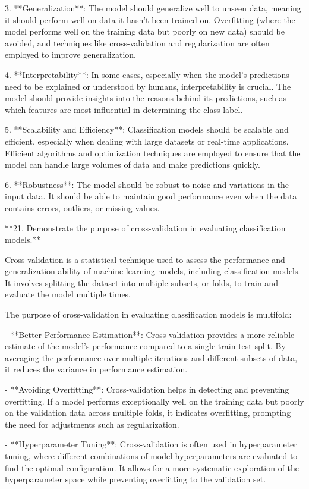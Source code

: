 3. **Generalization**: The model should generalize well to unseen data, meaning it should perform well on data it hasn't been trained on. Overfitting (where the model performs well on the training data but poorly on new data) should be avoided, and techniques like cross-validation and regularization are often employed to improve generalization.

4. **Interpretability**: In some cases, especially when the model's predictions need to be explained or understood by humans, interpretability is crucial. The model should provide insights into the reasons behind its predictions, such as which features are most influential in determining the class label.

5. **Scalability and Efficiency**: Classification models should be scalable and efficient, especially when dealing with large datasets or real-time applications. Efficient algorithms and optimization techniques are employed to ensure that the model can handle large volumes of data and make predictions quickly.

6. **Robustness**: The model should be robust to noise and variations in the input data. It should be able to maintain good performance even when the data contains errors, outliers, or missing values.

**21. Demonstrate the purpose of cross-validation in evaluating classification models.**

Cross-validation is a statistical technique used to assess the performance and generalization ability of machine learning models, including classification models. It involves splitting the dataset into multiple subsets, or folds, to train and evaluate the model multiple times.

The purpose of cross-validation in evaluating classification models is multifold:

- **Better Performance Estimation**: Cross-validation provides a more reliable estimate of the model's performance compared to a single train-test split. By averaging the performance over multiple iterations and different subsets of data, it reduces the variance in performance estimation.

- **Avoiding Overfitting**: Cross-validation helps in detecting and preventing overfitting. If a model performs exceptionally well on the training data but poorly on the validation data across multiple folds, it indicates overfitting, prompting the need for adjustments such as regularization.

- **Hyperparameter Tuning**: Cross-validation is often used in hyperparameter tuning, where different combinations of model hyperparameters are evaluated to find the optimal configuration. It allows for a more systematic exploration of the hyperparameter space while preventing overfitting to the validation set.


